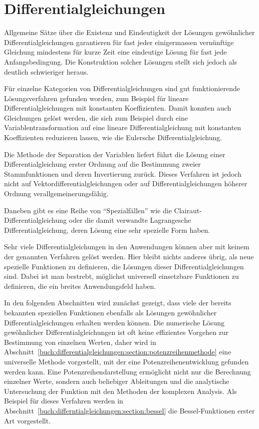 %
%
%
\chapter{Differentialgleichungen
\label{buch:chapter:differential}}
\rhead{}
Allgemeine Sätze über die Existenz und Eindeutigkeit der Lösungen
gewöhnlicher Differentialgleichungen garantieren für fast jeder 
einigermassen vernünftige Gleichung mindestens für kurze Zeit
eine eindeutige Lösung für fast jede Anfangsbedingung.
Die Konstruktion solcher Lösungen stellt sich jedoch als deutlich
schwieriger heraus.

Für einzelne Kategorien von Differentialgleichungen sind 
gut funktionierende Lösungsverfahren gefunden worden, zum Beispiel
für lineare Differentialgleichungen mit konstanten Koeffizienten.
Damit konnten auch Gleichungen gelöst werden, die sich zum Beispiel
durch eine Variablentransformation auf eine lineare Differentialgleichung
mit konstanten Koeffizienten reduzieren lassen, wie die Eulersche
Differentialgleichung.

Die Methode der Separation der Variablen liefert führt die Lösung
einer Differentialgleichung erster Ordnung auf die Bestimmung 
zweier Stammfunktionen und deren Invertierung zurück.
Dieses Verfahren ist jedoch nicht auf Vektordifferentialgleichungen
oder auf Differentialgleichungen höherer Ordnung verallgemeinerungsfähig.

Daneben gibt es eine Reihe von ``Spezialfällen'' wie die
Clairaut-Differentialgleichung oder die damit verwandte
Lagrangesche Differentialgleichung, deren Lösung eine sehr
spezielle Form haben.

Sehr viele Differentialgleichungen in den Anwendungen können aber
mit keinem der genannten Verfahren gelöst werden.
Hier bleibt nichts anderes übrig, als neue spezielle Funktionen
zu definieren, die Lösungen dieser Differentialgleichungen sind.
Dabei ist man bestrebt, möglichst universell einsetzbare Funktionen
zu definieren, die ein breites Anwendungsfeld haben.

In den folgenden Abschnitten wird zunächst gezeigt, dass viele
der bereits bekannten speziellen Funktionen ebenfalls als Lösungen
gewöhnlicher Differentialgleichungen erhalten werden können.
Die numerische Lösung gewöhnlicher Differentialgleichungen ist
oft keine effizientes Vorgehen zur Bestimmung von einzelnen Werten,
daher wird in
Abschnitt~\ref{buch:differentialgleichungen:section:potenzreihenmethode}
eine universelle Methode vorgestellt, mit der eine Potenzreihenentwicklung
gefunden werden kann.
Eine Potenzreihendarstellung ermöglicht nicht nur die Berechnung
einzelner Werte, sondern auch beliebiger Ableitungen und die
analytische Untersuchung der Funktion mit den Methoden der
komplexen Analysis.
Als Beispiel für dieses Verfahren werden in
Abschnitt~\ref{buch:differntialgleichungen:section:bessel}
die Bessel-Funktionen erster Art vorgestellt.

